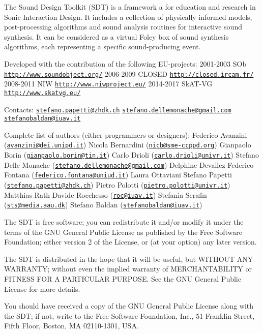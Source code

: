 The \textquotesingle{}Sound Design Toolkit\textquotesingle{} (S\+D\+T) is a framework a for education and research in Sonic Interaction Design. It includes a collection of physically informed models, post-\/processing algorithms and sound analysis routines for interactive sound synthesis. It can be considered as a virtual Foley box of sound synthesis algorithms, each representing a specific sound-\/producing event.

Developed with the contribution of the following E\+U-\/projects\+: 2001-\/2003 \textquotesingle{}S\+Ob\textquotesingle{} \href{http://www.soundobject.org/}{\tt http\+://www.\+soundobject.\+org/} 2006-\/2009 \textquotesingle{}C\+L\+O\+S\+E\+D\textquotesingle{} \href{http://closed.ircam.fr/}{\tt http\+://closed.\+ircam.\+fr/} 2008-\/2011 \textquotesingle{}N\+I\+W\textquotesingle{} \href{http://www.niwproject.eu/}{\tt http\+://www.\+niwproject.\+eu/} 2014-\/2017 \textquotesingle{}Sk\+A\+T-\/\+V\+G\textquotesingle{} \href{http://www.skatvg.eu/}{\tt http\+://www.\+skatvg.\+eu/}

Contacts\+: \href{mailto:stefano.papetti@zhdk.ch}{\tt stefano.\+papetti@zhdk.\+ch} \href{mailto:stefano.dellemonache@gmail.com}{\tt stefano.\+dellemonache@gmail.\+com} \href{mailto:stefanobaldan@iuav.it}{\tt stefanobaldan@iuav.\+it}

Complete list of authors (either programmers or designers)\+: Federico Avanzini (\href{mailto:avanzini@dei.unipd.it}{\tt avanzini@dei.\+unipd.\+it}) Nicola Bernardini (\href{mailto:nicb@sme-ccppd.org}{\tt nicb@sme-\/ccppd.\+org}) Gianpaolo Borin (\href{mailto:gianpaolo.borin@tin.it}{\tt gianpaolo.\+borin@tin.\+it}) Carlo Drioli (\href{mailto:carlo.drioli@univr.it}{\tt carlo.\+drioli@univr.\+it}) Stefano Delle Monache (\href{mailto:stefano.dellemonache@gmail.com}{\tt stefano.\+dellemonache@gmail.\+com}) Delphine Devallez Federico Fontana (\href{mailto:federico.fontana@uniud.it}{\tt federico.\+fontana@uniud.\+it}) Laura Ottaviani Stefano Papetti (\href{mailto:stefano.papetti@zhdk.ch}{\tt stefano.\+papetti@zhdk.\+ch}) Pietro Polotti (\href{mailto:pietro.polotti@univr.it}{\tt pietro.\+polotti@univr.\+it}) Matthias Rath Davide Rocchesso (\href{mailto:roc@iuav.it}{\tt roc@iuav.\+it}) Stefania Serafin (\href{mailto:sts@media.aau.dk}{\tt sts@media.\+aau.\+dk}) Stefano Baldan (\href{mailto:stefanobaldan@iuav.it}{\tt stefanobaldan@iuav.\+it})

The S\+D\+T is free software; you can redistribute it and/or modify it under the terms of the G\+N\+U General Public License as published by the Free Software Foundation; either version 2 of the License, or (at your option) any later version.

The S\+D\+T is distributed in the hope that it will be useful, but W\+I\+T\+H\+O\+U\+T A\+N\+Y W\+A\+R\+R\+A\+N\+T\+Y; without even the implied warranty of M\+E\+R\+C\+H\+A\+N\+T\+A\+B\+I\+L\+I\+T\+Y or F\+I\+T\+N\+E\+S\+S F\+O\+R A P\+A\+R\+T\+I\+C\+U\+L\+A\+R P\+U\+R\+P\+O\+S\+E. See the G\+N\+U General Public License for more details.

You should have received a copy of the G\+N\+U General Public License along with the S\+D\+T; if not, write to the Free Software Foundation, Inc., 51 Franklin Street, Fifth Floor, Boston, M\+A 02110-\/1301, U\+S\+A. 